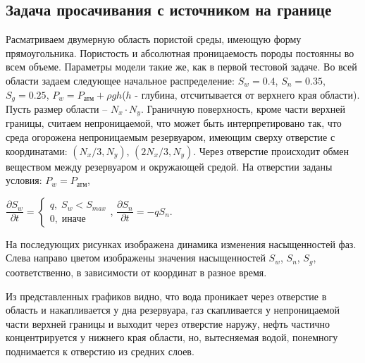 \subsection{Задача просачивания с источником на границе}
Расматриваем двумерную область пористой среды, имеющую форму
прямоугольника. Пористость и абсолютная проницаемость породы постоянны во всем
объеме. Параметры модели такие же, как
в первой тестовой задаче.
Во всей области задаем следующее 
начальное распределение: $S_w=0.4$,\; $S_n=0.35$,\; $S_g=0.25$, 
$P_w=P_\text{атм}+\rho g h$($h$ - глубина, отсчитывается от верхнего края области).
Пусть размер области -- $N_x\cdot N_y$.
Граничную поверхность, кроме части верхней границы, считаем непроницаемой, 
что может быть интерпретировано так,
что среда огорожена непроницаемым резервуаром, имеющим сверху отверстие с
координатами: $(N_x/3, N_y)$, $(2N_x/3, N_y)$. Через отверстие происходит обмен веществом между 
резервуаром и окружающей средой. На отверстии заданы условия: $P_w=P_\text{атм}$,

$ \dfrac{\partial S_w}{\partial t}= 
\begin{cases}
 q, \; S_w<S_{max}\\
 0, \; \text{иначе}
\end{cases}
$,
$ \dfrac{\partial S_n}{\partial t}=-q S_n$.

На последующих рисунках изображена динамика изменения насыщенностей 
фаз. Слева направо цветом изображены значения насыщенностей $S_w$, $S_n$, $S_g$, соответственно, 
в зависимости от координат в разное время.

Из представленных графиков видно, что вода проникает через отверстие в область и накапливается 
у дна резервуара, газ скапливается у непроницаемой части верхней границы и выходит через отверстие 
наружу, нефть частично концентрируется у нижнего края области, но, вытесняемая водой,
 понемногу поднимается к отверстию из средних слоев.
